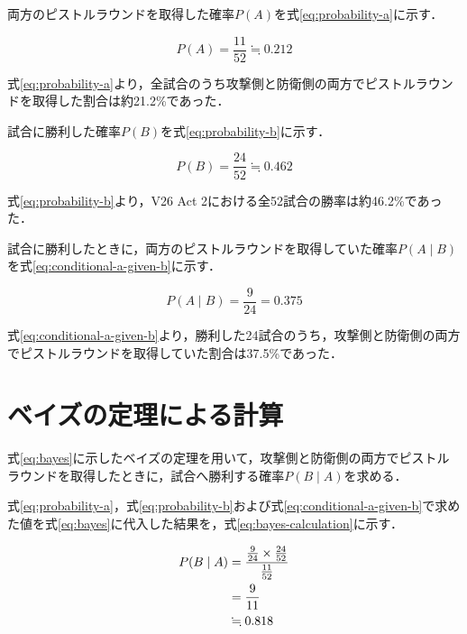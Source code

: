 \documentclass[titlepage,a4paper]{jsarticle}
\begin{document}
両方のピストルラウンドを取得した確率$P(A)$を式\eqref{eq:probability-a}に示す．

\begin{equation}
  P(A)
  =
  \frac{11}{52}
  \fallingdotseq
  0.212
  \label{eq:probability-a}
\end{equation}

式\eqref{eq:probability-a}より，全試合のうち攻撃側と防衛側の両方でピストルラウンドを取得した割合は約21.2\%であった．

試合に勝利した確率$P(B)$を式\eqref{eq:probability-b}に示す．

\begin{equation}
  P(B)
  =
  \frac{24}{52}
  \fallingdotseq
  0.462
  \label{eq:probability-b}
\end{equation}

式\eqref{eq:probability-b}より，V26 Act 2における全52試合の勝率は約46.2\%であった．

試合に勝利したときに，両方のピストルラウンドを取得していた確率$P(A \mid B)$を式\eqref{eq:conditional-a-given-b}に示す．

\begin{equation}
  P(A \mid B)
  =
  \frac{9}{24}
  =
  0.375
  \label{eq:conditional-a-given-b}
\end{equation}

式\eqref{eq:conditional-a-given-b}より，勝利した24試合のうち，攻撃側と防衛側の両方でピストルラウンドを取得していた割合は37.5\%であった．


\section{ベイズの定理による計算}

式\eqref{eq:bayes}に示したベイズの定理を用いて，攻撃側と防衛側の両方でピストルラウンドを取得したときに，試合へ勝利する確率$P(B \mid A)$を求める．

式\eqref{eq:probability-a}，式\eqref{eq:probability-b}および式\eqref{eq:conditional-a-given-b}で求めた値を式\eqref{eq:bayes}に代入した結果を，式\eqref{eq:bayes-calculation}に示す．

\begin{align}
  P(B \mid A)
  &=
  \frac{
    \frac{9}{24}
    \times
    \frac{24}{52}
  }{
    \frac{11}{52}
  }
  \notag\\
  &=
  \frac{9}{11}
  \notag\\
  &\fallingdotseq
  0.818
  \label{eq:bayes-calculation}
\end{align}
\end{document}
